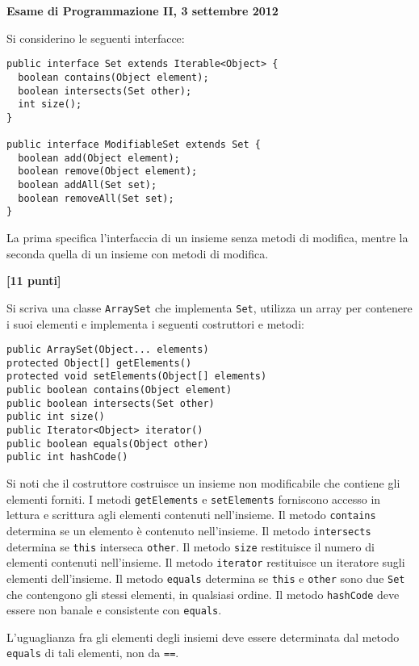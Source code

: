 \documentclass{article}[10pt]
\newcounter{esnu}
\newenvironment{esercizio}{\medskip \noindent {\bf Esercizio\addtocounter{esnu}{1} \arabic{esnu}}}{}
\begin{document}
\begin{center} {\bf Esame di Programmazione II, 3 settembre 2012}\end{center}

Si considerino le seguenti interfacce:

{\small
\begin{verbatim}
public interface Set extends Iterable<Object> {
  boolean contains(Object element);
  boolean intersects(Set other);
  int size();
}

public interface ModifiableSet extends Set {
  boolean add(Object element);
  boolean remove(Object element);
  boolean addAll(Set set);
  boolean removeAll(Set set);
}
\end{verbatim}
}

\noindent
La prima specifica l'interfaccia di un insieme senza metodi di modifica, mentre la seconda
quella di un insieme con metodi di modifica.

\begin{esercizio}
\textbf{[11 punti]}

Si scriva una classe \texttt{ArraySet} che implementa \texttt{Set}, utilizza un array per contenere
i suoi elementi e implementa i seguenti costruttori e metodi:

{\small
\begin{verbatim}
public ArraySet(Object... elements)
protected Object[] getElements()
protected void setElements(Object[] elements)
public boolean contains(Object element)
public boolean intersects(Set other)
public int size()
public Iterator<Object> iterator()
public boolean equals(Object other)
public int hashCode()
\end{verbatim}
}

\noindent
Si noti che il costruttore costruisce un insieme non modificabile che contiene gli elementi forniti.
I metodi \texttt{getElements} e \texttt{setElements} forniscono accesso in lettura e scrittura
agli elementi contenuti nell'insieme.
Il metodo \texttt{contains} determina se un elemento \`e contenuto nell'insieme.
Il metodo \texttt{intersects} determina se \texttt{this} interseca \texttt{other}.
Il metodo \texttt{size} restituisce il numero di elementi contenuti nell'insieme.
Il metodo \texttt{iterator} restituisce un iteratore sugli elementi dell'insieme. Il metodo
\texttt{equals} determina se \texttt{this} e \texttt{other} sono due \texttt{Set} che contengono gli stessi
elementi, in qualsiasi ordine. Il metodo \texttt{hashCode} deve essere non banale e consistente con \texttt{equals}.

L'uguaglianza fra gli elementi degli insiemi deve essere determinata dal metodo \texttt{equals} di tali elementi,
non da \texttt{==}.
\end{esercizio}
\end{document}
